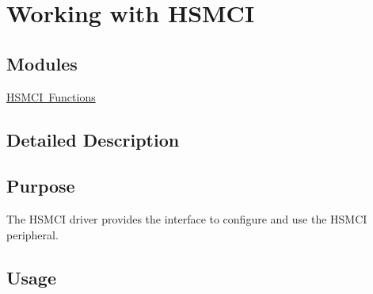 \hypertarget{group__hsmci__module}{}\section{Working with H\+S\+M\+CI}
\label{group__hsmci__module}
\subsection*{Modules}
\begin{DoxyCompactItemize}
\item 
\mbox{\hyperlink{group__hsmci__functions}{H\+S\+M\+C\+I Functions}}
\end{DoxyCompactItemize}


\subsection{Detailed Description}
\hypertarget{group__RTEMSBSPsARM_Purpose}{}\subsection{Purpose}\label{group__RTEMSBSPsARM_Purpose}
The H\+S\+M\+CI driver provides the interface to configure and use the H\+S\+M\+CI peripheral.\hypertarget{group__RTEMSBSPsARM_Usage}{}\subsection{Usage}\label{group__RTEMSBSPsARM_Usage}

